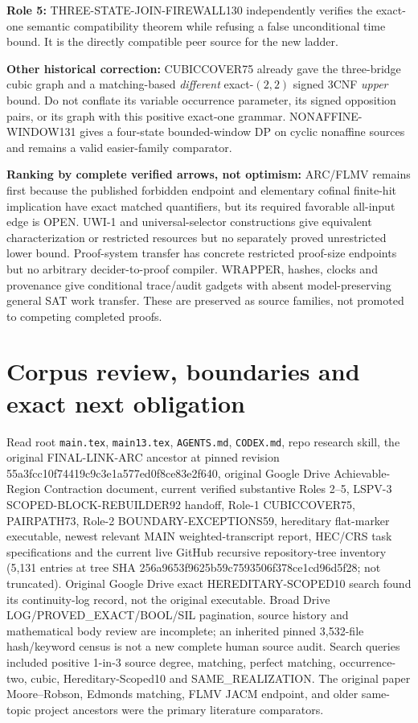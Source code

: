 \documentclass[11pt]{article}
\begin{document}
\noindent\textbf{Role 5:} THREE-STATE-JOIN-FIREWALL130 independently verifies the exact-one semantic compatibility theorem while refusing a false unconditional time bound. It is the directly compatible peer source for the new ladder.

\noindent\textbf{Other historical correction:} CUBICCOVER75 already gave the three-bridge cubic graph and a matching-based \emph{different} exact-\((2,2)\) signed 3CNF \emph{upper} bound. Do not conflate its variable occurrence parameter, its signed opposition pairs, or its graph with this positive exact-one grammar. NONAFFINE-WINDOW131 gives a four-state bounded-window DP on cyclic nonaffine sources and remains a valid easier-family comparator.

\noindent\textbf{Ranking by complete verified arrows, not optimism:} ARC/FLMV remains first because the published forbidden endpoint and elementary cofinal finite-hit implication have exact matched quantifiers, but its required favorable all-input edge is OPEN. UWI-1 and universal-selector constructions give equivalent characterization or restricted resources but no separately proved unrestricted lower bound. Proof-system transfer has concrete restricted proof-size endpoints but no arbitrary decider-to-proof compiler. WRAPPER, hashes, clocks and provenance give conditional trace/audit gadgets with absent model-preserving general SAT work transfer. These are preserved as source families, not promoted to competing completed proofs.

\section{Corpus review, boundaries and exact next obligation}
Read root \texttt{main.tex}, \texttt{main13.tex}, \texttt{AGENTS.md}, \texttt{CODEX.md}, repo research skill, the original FINAL-LINK-ARC ancestor at pinned revision 55a3fcc10f74419c9c3e1a577ed0f8ce83e2f640, original Google Drive Achievable-Region Contraction document, current verified substantive Roles 2--5, LSPV-3 SCOPED-BLOCK-REBUILDER92 handoff, Role-1 CUBICCOVER75, PAIRPATH73, Role-2 BOUNDARY-EXCEPTIONS59, hereditary flat-marker executable, newest relevant MAIN weighted-transcript report, HEC/CRS task specifications and the current live GitHub recursive repository-tree inventory (5,131 entries at tree SHA 256a9653f9625b59c7593506f378ce1cd96d5f28; not truncated). Original Google Drive exact HEREDITARY-SCOPED10 search found its continuity-log record, not the original executable. Broad Drive LOG/PROVED_EXACT/BOOL/SIL pagination, source history and mathematical body review are incomplete; an inherited pinned 3,532-file hash/keyword census is not a new complete human source audit. Search queries included positive 1-in-3 source degree, matching, perfect matching, occurrence-two, cubic, Hereditary-Scoped10 and SAME_REALIZATION. The original paper Moore--Robson, Edmonds matching, FLMV JACM endpoint, and older same-topic project ancestors were the primary literature comparators.
\end{document}
